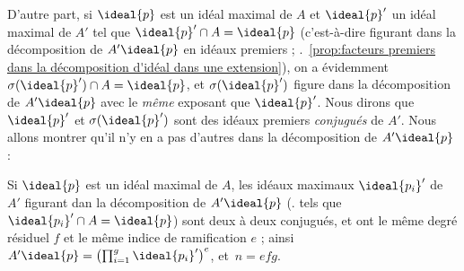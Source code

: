 \documentclass[11pt, %
  title in boldface,
  theorem in new line,
  theorem numbering = section,
  number theorems separately,
  simple name,
]{beaulivre}
\begin{document}
    D'autre part, si \( \ideal{p} \) est un idéal maximal de \( A \) et \( \ideal{p}' \) un idéal maximal de \( A' \) tel que \( \ideal{p}' \cap A = \ideal{p} \) (c'est-à-dire figurant dans la décomposition de \( A' \ideal{p} \) en idéaux premiers ; \cf.~\cref{prop:facteurs premiers dans la décomposition d'idéal dans une extension}), on a évidemment \( \sigma(\ideal{p}') \cap A = \ideal{p} \), et \( \sigma(\ideal{p}') \) figure dans la décomposition de \( A'\ideal{p} \) avec le \emph{même} exposant que \( \ideal{p}' \). Nous dirons que \( \ideal{p}' \) et \( \sigma(\ideal{p}') \) sont des idéaux premiers \emph{conjugués} de \( A' \). Nous allons montrer qu'il n'y en a pas d'autres dans la décomposition de \( A'\ideal{p} \) :
    \begin{proposition}\label{prop:décomposition dans une extension;conugués}
        Si \( \ideal{p} \) est un idéal maximal de \( A \), les idéaux maximaux \( \ideal{p_i}' \) de \( A' \) figurant dan la décomposition de \( A'\ideal{p} \) (\ie. tels que \( \ideal{p_i}' \cap A = \ideal{p} \)) sont deux à deux conjugués, et ont le même degré résiduel \( f \) et le même indice de ramification \( e \) ; ainsi \( A'\ideal{p} = \left(\prod_{i=1}^g \ideal{p_i}'\right)^e \), et~\( n = efg \).
    \end{proposition}
\end{document}
